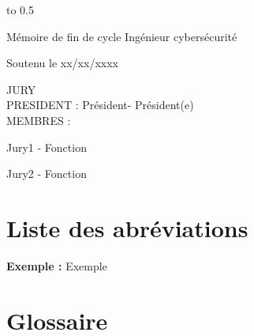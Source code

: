 \documentclass[12pt]{article}
\newcommand\titre{Mémoire de fin de cycle Ingénieur cybersécurité}      %
\newcommand\dateSoutenance{xx/xx/xxxx}
\newcommand\presidentJury{Président}
\newcommand\membresJury{
    Jury1 - Fonction

    Jury2 - Fonction
}
\begin{document}
\begin{titlepage}
\begin{center}
        \@author
        \vspace*{0.5cm}

        \centerline{\hbox to 0.5\textwidth{\hrulefill}}
        \vspace*{1cm}

        \titre\\
        \vspace*{0.5cm}


        Soutenu le \dateSoutenance\\
        \vspace*{0.5cm}


    \end{center}


    \vfill{}                                    %
    {\parindent0pt
        JURY\\
        PRESIDENT : \presidentJury - Président(e)\\
        MEMBRES : 
        
        \membresJury

    }

\end{titlepage}

\newpage
\vspace*{\fill} %
\newpage

\tableofcontents

\newpage

\listoffigures

\newpage

\setcounter{page}{1}    %
\pagestyle{plain}       %

\pagestyle{fancy}       %
\fancyhf{}
\fancyfoot[R]{\thepage}

\section*{Liste des abréviations}

\textbf{Exemple :} Exemple\\

\newpage

\section*{Glossaire}
\end{document}
